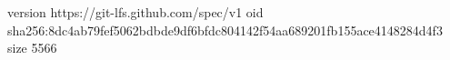 version https://git-lfs.github.com/spec/v1
oid sha256:8dc4ab79fef5062bdbde9df6bfdc804142f54aa689201fb155ace4148284d4f3
size 5566
